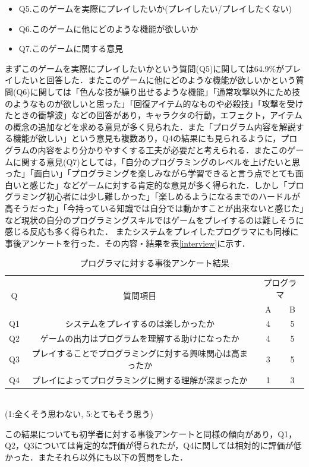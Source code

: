 \begin{itemize}
  \item Q5.このゲームを実際にプレイしたいか(プレイしたい/プレイしたくない)
  \item Q6.このゲームに他にどのような機能が欲しいか
  \item Q7.このゲームに関する意見
\end{itemize}

まずこのゲームを実際にプレイしたいかという質問(Q5)に関しては64.9\%がプレイしたいと回答した．またこのゲームに他にどのような機能が欲しいかという質問(Q6)に関しては「色んな技が繰り出せるような機能」「通常攻撃以外にため技のようなものが欲しいと思った」「回復アイテム的なものや必殺技」「攻撃を受けたときの衝撃波」などの回答があり，キャラクタの行動，エフェクト，アイテムの概念の追加などを求める意見が多く見られた．また「プログラム内容を解説する機能が欲しい」という意見も複数あり，Q4の結果にも見られるように，プログラムの内容をより分かりやすくする工夫が必要だと考えられる．またこのゲームに関する意見(Q7)としては，「自分のプログラミングのレベルを上げたいと思った」「面白い」「プログラミングを楽しみながら学習できると言う点でとても面白いと感じた」などゲームに対する肯定的な意見が多く得られた．しかし「プログラミング初心者には少し難しかった」「楽しめるようになるまでのハードルが高そうだった」「今持っている知識では自分では動かすことが出来ないと感じた」など現状の自分のプログラミングスキルではゲームをプレイするのは難しそうに感じる反応も多く得られた．
またシステムをプレイしたプログラマにも同様に事後アンケートを行った．その内容・結果を表\ref{interview}に示す．

\begin{table}[!ht]
  \centering
  \caption{プログラマに対する事後アンケート結果}
  \label{programmer_interview}
    \begin{tabular}{|c|c|c|c|} \hline
      \multirow{2}{*}{Q} & \multirow{2}{*}{質問項目} & \multicolumn{2}{c}{プログラマ} \\ 
        & &A&B\\ \hline\hline
      Q1 & システムをプレイするのは楽しかったか & 4 & 5 \\ \hline
      Q2 & ゲームの出力はプログラムを理解する助けになったか & 4 & 5\\ \hline
      Q3 & プレイすることでプログラミングに対する興味関心は高まったか & 3 & 5\\ \hline
      Q4 & プレイによってプログラミングに関する理解が深まったか & 1 & 3\\ \hline
    \end{tabular}
    \\(1:全くそう思わない, 5:とてもそう思う)
\end{table}
この結果についても初学者に対する事後アンケートと同様の傾向があり，Q1，Q2，Q3については肯定的な評価が得られたが，Q4に関しては相対的に評価が低かった．またそれら以外にも以下の質問をした．

